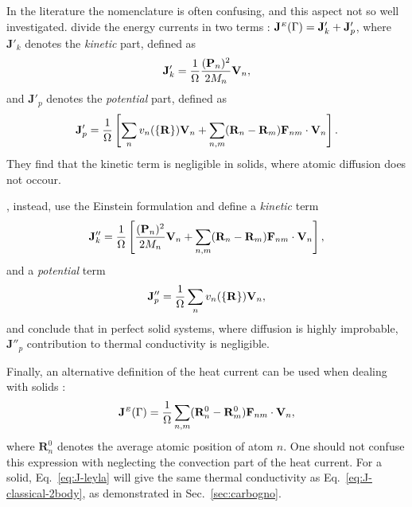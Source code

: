 \begin{LEtext}
In the literature the nomenclature is often confusing, and this aspect not so well investigated. \citet{Vogelsang1987} divide the energy currents in two terms \cite{McQuarrie2000}: $\mathbf{J}^{\scriptscriptstyle E}({\mathrm\Gamma}) = \mathbf{J}'_k + \mathbf{J}'_p$, where $\mathbf{J}'_k$ denotes the \emph{kinetic} part, defined as
\begin{equation}
    \mathbf{J}'_k = \frac{1}{{\mathrm\Omega}} \frac{(\mathbf{P}_n)^2}{2M_n} \mathbf{V}_n ,
\end{equation}
and $\mathbf{J}'_p$ denotes the \emph{potential} part, defined as
\begin{equation}
    \mathbf{J}'_p = \frac{1}{{\mathrm\Omega}} \left[ \sum_n  v_n(\{\mathbf{R}\}) \mathbf{V}_n + \sum_{n,m} (\mathbf{R}_n-\mathbf{R}_m) \mathbf{F}_{n m} \cdot \mathbf{V}_n \right] .
\end{equation}
They find that the kinetic term is negligible in solids, where atomic diffusion does not occour.

\citet{Kinaci2012}, instead, use the Einstein formulation and define a \emph{kinetic} term
\begin{equation}
    \mathbf{J}''_k = \frac{1}{{\mathrm\Omega}} \left[ \frac{(\mathbf{P}_n)^2}{2M_n} \mathbf{V}_n + \sum_{n,m} (\mathbf{R}_n-\mathbf{R}_m) \mathbf{F}_{n m} \cdot \mathbf{V}_n \right],
\end{equation}
and a \emph{potential} term
\begin{equation}
    \mathbf{J}''_p = \frac{1}{{\mathrm\Omega}} \sum_n  v_n(\{\mathbf{R}\}) \mathbf{V}_n ,
\end{equation}
and conclude that in perfect solid systems, where diffusion is highly improbable, $\mathbf{J}''_p$ contribution to thermal conductivity is negligible.

Finally, an alternative definition of the heat current can be used when dealing with solids \cite{Ladd1986}:
\begin{equation}
    \mathbf{J}^\smallE(\rGamma) =
       \frac{1}{\rOmega} \sum_{n,m} (\mathbf{R}_n^0 -\mathbf{R}_m^0) \mathbf{F}_{n m} \cdot \mathbf{V}_n , \label{eq:J-leyla}
\end{equation}
where $\mathbf{R}_n^0$ denotes the average atomic position of atom $n$. One should not confuse this expression with neglecting the convection part of the heat current. For a solid, Eq.~\eqref{eq:J-leyla} will give the same thermal conductivity as Eq.~\eqref{eq:J-classical-2body}, as demonstrated in Sec.~\ref{sec:carbogno}.



\end{LEtext}
